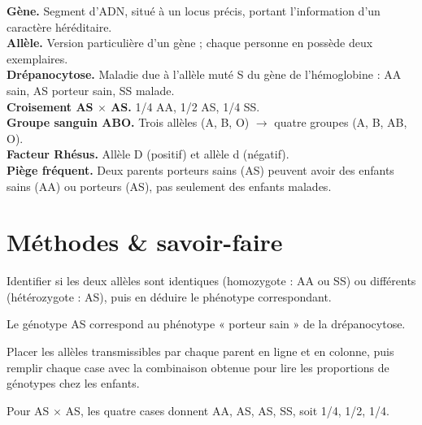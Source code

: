 \begin{synthese}
\textbf{Gène.} Segment d'ADN, situé à un locus précis, portant l'information d'un
caractère héréditaire.\\[4pt]
\textbf{Allèle.} Version particulière d'un gène ; chaque personne en possède deux
exemplaires.\\[4pt]
\textbf{Drépanocytose.} Maladie due à l'allèle muté S du gène de l'hémoglobine :
AA sain, AS porteur sain, SS malade.\\[4pt]
\textbf{Croisement AS $\times$ AS.} 1/4 AA, 1/2 AS, 1/4 SS.\\[4pt]
\textbf{Groupe sanguin ABO.} Trois allèles (A, B, O) $\to$ quatre groupes (A, B, AB,
O).\\[4pt]
\textbf{Facteur Rhésus.} Allèle D (positif) et allèle d (négatif).\\[4pt]
\textbf{Piège fréquent.} Deux parents porteurs sains (AS) peuvent avoir des enfants
sains (AA) ou porteurs (AS), pas seulement des enfants malades.
\end{synthese}

\section{Méthodes \& savoir-faire}

Identifier si les deux allèles sont identiques (homozygote : AA ou SS) ou différents
(hétérozygote : AS), puis en déduire le phénotype correspondant.
\begin{exemple}
Le génotype AS correspond au phénotype « porteur sain » de la drépanocytose.
\end{exemple}

Placer les allèles transmissibles par chaque parent en ligne et en colonne, puis
remplir chaque case avec la combinaison obtenue pour lire les proportions de
génotypes chez les enfants.
\begin{exemple}
Pour AS $\times$ AS, les quatre cases donnent AA, AS, AS, SS, soit 1/4, 1/2, 1/4.
\end{exemple}

